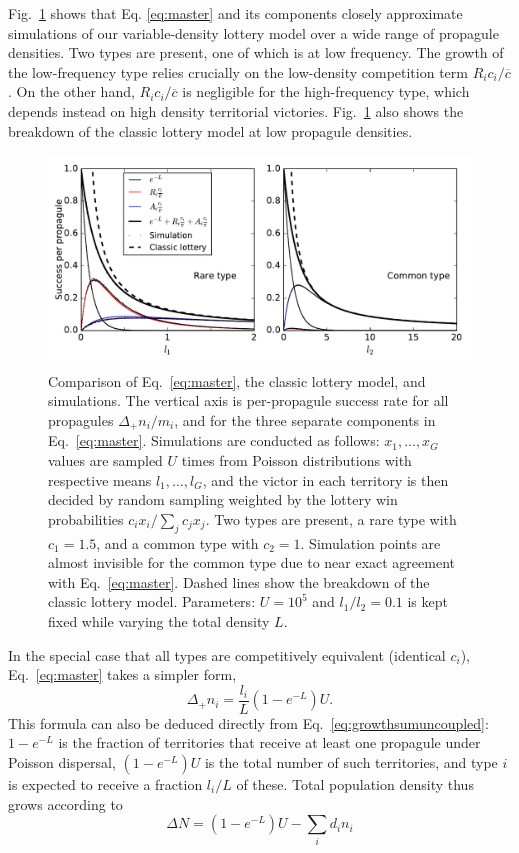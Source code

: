 \documentclass[12pt]{article}
\begin{document}
Fig.~\ref{fig:simcomp} shows that Eq. \eqref{eq:master} and its components closely approximate simulations of our variable-density lottery model over a wide range of propagule densities.  Two types are present, one of which is at low frequency. The growth of the low-frequency type relies crucially on the low-density competition term $R_i c_i/\overline{c}$. On the other hand, $R_i c_i/\overline{c}$ is negligible for the high-frequency type, which depends instead on high density territorial victories. Fig.~\ref{fig:simcomp} also shows the breakdown of the classic lottery model at low propagule densities.

\begin{figure}
\centering
\includegraphics[scale=0.8]{simulationcomparison.pdf}
\caption{\label{fig:simcomp} Comparison of Eq.~\eqref{eq:master}, the classic lottery model, and simulations. The vertical axis is per-propagule success rate for all propagules $\Delta_+ n_i/m_i$, and for the three separate components in Eq.~\eqref{eq:master}. Simulations are 	conducted as follows: $x_1,\ldots,x_G$ values are sampled $U$ times from Poisson distributions with respective means $l_1,\ldots,l_G$, and the victor in each territory is then decided by random sampling weighted by the lottery win probabilities $c_ix_i/\sum_j c_j x_j$. Two types are present, a rare type with $c_1=1.5$, and a common type with $c_2=1$. Simulation points are almost invisible for the common type due to near exact agreement with Eq.~\eqref{eq:master}. Dashed lines show the breakdown of the classic lottery model. Parameters: $U=10^5$ and $l_1/l_2=0.1$ is kept fixed while varying the total density $L$.} 
\end{figure}

In the special case that all types are competitively equivalent (identical $c_i$), Eq.~\eqref{eq:master} takes a simpler form,
\begin{equation}
\Delta_+ n_i = \frac{l_i}{L}(1-e^{-L})U. \label{eq:masterequalc}
\end{equation}
This formula can also be deduced directly from Eq.~\eqref{eq:growthsumuncoupled}: $1-e^{-L}$ is the fraction of territories that receive at least one propagule under Poisson dispersal, $(1-e^{-L})U$ is the total number of such territories, and type $i$ is expected to receive a fraction $l_i/L$ of these. Total population density thus grows according to
\begin{equation}
\Delta N=(1-e^{-L})U-\sum_i d_i n_i \label{eq:Nmaster}
\end{equation}
\end{document}
